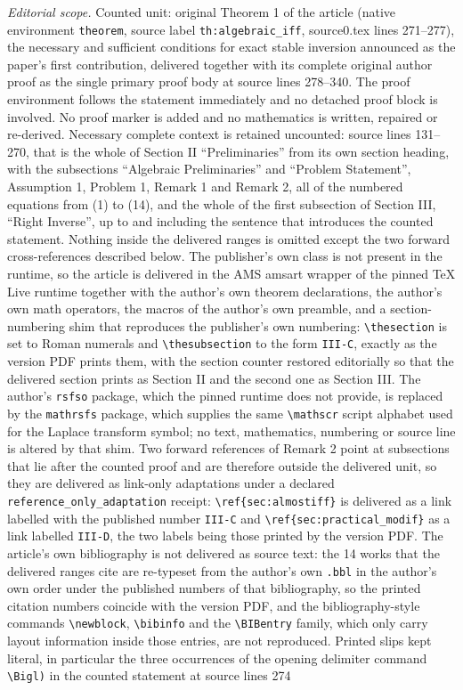 \documentclass[10pt,a4paper]{amsart}
\theoremstyle{remark}
\begin{document}
\noindent\textit{Editorial scope.} Counted unit: original Theorem 1 of the article (native environment \texttt{theorem}, source label \texttt{th:algebraic\_iff}, source0.tex lines 271--277), the necessary and sufficient conditions for exact stable inversion announced as the paper's first contribution, delivered together with its complete original author proof as the single primary proof body at source lines 278--340. The proof environment follows the statement immediately and no detached proof block is involved. No proof marker is added and no mathematics is written, repaired or re-derived. Necessary complete context is retained uncounted: source lines 131--270, that is the whole of Section II ``Preliminaries'' from its own section heading, with the subsections ``Algebraic Preliminaries'' and ``Problem Statement'', Assumption 1, Problem 1, Remark 1 and Remark 2, all of the numbered equations from (1) to (14), and the whole of the first subsection of Section III, ``Right Inverse'', up to and including the sentence that introduces the counted statement. Nothing inside the delivered ranges is omitted except the two forward cross-references described below. The publisher's own class is not present in the runtime, so the article is delivered in the AMS amsart wrapper of the pinned TeX Live runtime together with the author's own theorem declarations, the author's own math operators, the macros of the author's own preamble, and a section-numbering shim that reproduces the publisher's own numbering: \texttt{\textbackslash thesection} is set to Roman numerals and \texttt{\textbackslash thesubsection} to the form \texttt{III-C}, exactly as the version PDF prints them, with the section counter restored editorially so that the delivered section prints as Section II and the second one as Section III. The author's \texttt{rsfso} package, which the pinned runtime does not provide, is replaced by the \texttt{mathrsfs} package, which supplies the same \texttt{\textbackslash mathscr} script alphabet used for the Laplace transform symbol; no text, mathematics, numbering or source line is altered by that shim. Two forward references of Remark 2 point at subsections that lie after the counted proof and are therefore outside the delivered unit, so they are delivered as link-only adaptations under a declared \texttt{reference\_only\_adaptation} receipt: \texttt{\textbackslash ref\{sec:almostiff\}} is delivered as a link labelled with the published number \texttt{III-C} and \texttt{\textbackslash ref\{sec:practical\_modif\}} as a link labelled \texttt{III-D}, the two labels being those printed by the version PDF. The article's own bibliography is not delivered as source text: the 14 works that the delivered ranges cite are re-typeset from the author's own \texttt{.bbl} in the author's own order under the published numbers of that bibliography, so the printed citation numbers coincide with the version PDF, and the bibliography-style commands \texttt{\textbackslash newblock}, \texttt{\textbackslash bibinfo} and the \texttt{\textbackslash BIBentry} family, which only carry layout information inside those entries, are not reproduced. Printed slips kept literal, in particular the three occurrences of the opening delimiter command \texttt{\textbackslash Bigl)} in the counted statement at source lines 274 
\end{document}
